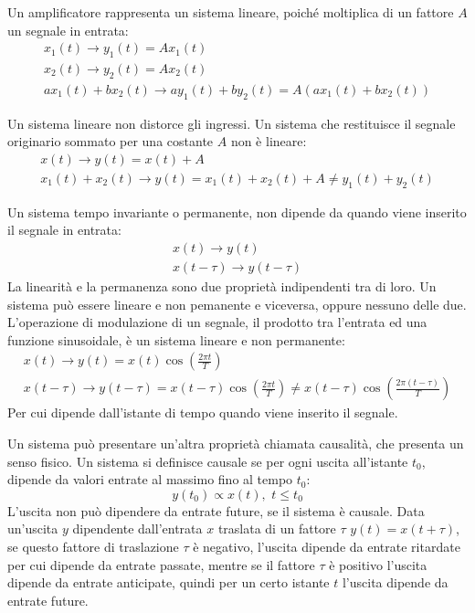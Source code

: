 \documentclass{article}
\numberwithin{equation}{subsection}
\begin{document}
Un amplificatore rappresenta un sistema lineare, poiché moltiplica di un fattore $A$ un segnale in entrata:
\begin{gather*}
    x_1(t)\to y_1(t)=Ax_1(t)\\
    x_2(t)\to y_2(t)=Ax_2(t)\\
    ax_1(t)+bx_2(t)\to ay_1(t)+by_2(t)=A(ax_1(t)+bx_2(t))
\end{gather*} 
\begin{center}
\end{center}
Un sistema lineare non distorce gli ingressi. Un sistema che restituisce il segnale originario sommato per una costante $A$ non è lineare:
\begin{gather*}
    x(t)\to y(t)=x(t)+A\\
    x_1(t)+x_2(t)\to y(t)=x_1(t)+x_2(t)+A\neq y_1(t)+y_2(t)
\end{gather*}


Un sistema tempo invariante o permanente, non dipende da quando viene inserito il segnale in entrata:
\begin{gather*}
    x(t)\to y(t)\\
    x(t-\tau)\to y(t-\tau)
\end{gather*}
La linearità e la permanenza sono due proprietà indipendenti tra di loro. Un sistema può essere lineare e non pemanente e viceversa, oppure nessuno delle due. 
L'operazione di modulazione di un segnale, il prodotto tra l'entrata ed una funzione sinusoidale, è un sistema lineare e non permanente:
\begin{gather*}
    x(t)\to y(t)=x(t)\cos\displaystyle\left(\frac{2\pi t}{T}\right)\\
    x(t-\tau)\to y(t-\tau)=x(t-\tau)\displaystyle\cos\left(\frac{2\pi t}{T}\right)\neq x(t-\tau)\cos\left(\frac{2\pi (t-\tau)}{T}\right)
\end{gather*}
Per cui dipende dall'istante di tempo quando viene inserito il segnale. 


Un sistema può presentare un'altra proprietà chiamata causalità, che presenta un senso fisico. Un sistema si definisce causale se per ogni uscita all'istante $t_0$, dipende 
da valori entrate al massimo fino al tempo $t_0$: 
\begin{equation*}
    y(t_0)\propto x(t),\,\,t\leq t_0
\end{equation*}
L'uscita non può dipendere da entrate future, se il sistema è causale.
Data un'uscita $y$ dipendente dall'entrata $x$ traslata di un fattore $\tau$ $y(t)=x(t+\tau)$, se questo fattore di traslazione $\tau$ è negativo, l'uscita dipende da entrate ritardate 
per cui dipende da entrate passate, mentre se il fattore $\tau$ è positivo l'uscita dipende da entrate anticipate, quindi per un certo istante $t$ l'uscita dipende da entrate 
future. 
\end{document}
